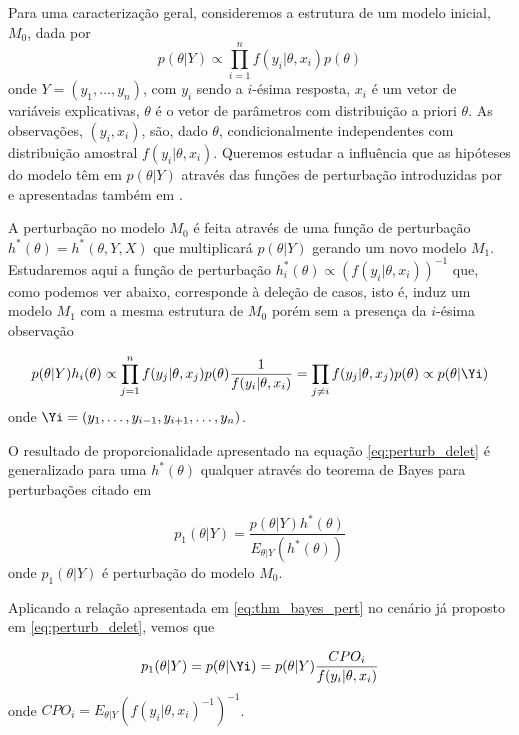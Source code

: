 Para uma caracterização geral, consideremos a estrutura de um modelo inicial, $M_0$, dada por
\begin{equation*}
p(\theta|Y)\propto \prod_{i=1}^n f(y_i|\theta,x_i) p(\theta)
\end{equation*}
onde $Y=(y_1,\ldots,y_n)$, com $y_i$ sendo a $i$-ésima resposta, $x_i$ é um vetor de variáveis explicativas, $\theta$ é o vetor de parâmetros com distribuição a priori $\theta$. As observações, $(y_i,x_i)$, são, dado $\theta$, condicionalmente independentes com distribuição amostral $f(y_i|\theta,x_i)$. Queremos estudar a influência que as hipóteses do modelo têm em $p(\theta|Y)$ através das funções de perturbação introduzidas por \citet{Kass1989} e apresentadas também em \citet{Weiss1996}.

A perturbação no modelo $M_0$ é feita através de uma função de perturbação $h^*(\theta)=h^*(\theta,Y,X)$ que multiplicará $p(\theta|Y)$ gerando um novo modelo $M_1$. Estudaremos aqui a função de perturbação $h^*_i(\theta)\propto\left(f(y_i|\theta,x_i)\right)^{-1}$ que, como podemos ver abaixo, corresponde à deleção de casos, isto é, induz um modelo $M_1$ com a mesma estrutura de $M_0$ porém sem a presença da $i$-ésima observação

\begin{equation}\label{eq:perturb_delet}
p(\theta|Y)h_i(\theta)\propto \prod_{j=1}^nf(y_j|\theta,x_j) p(\theta)\frac{1}{f(y_i|\theta,x_i)}=\prod_{j\neq i}f(y_j|\theta,x_j)p(\theta)\propto p(\theta|\Yi)
\end{equation}
onde $\Yi=(y_1,\ldots,y_{i-1},y_{i+1},\ldots,y_n)$.

O resultado de proporcionalidade apresentado na equação \ref{eq:perturb_delet} é generalizado para uma $h^*(\theta)$ qualquer através do teorema de Bayes para perturbações citado em \citet{Weiss1996}

\begin{equation}\label{eq:thm_bayes_pert}
p_1(\theta|Y)=\frac{p(\theta|Y)h^*(\theta)}{E_{\theta|Y}(h^*(\theta))}
\end{equation}
onde $p_1(\theta|Y)$ é perturbação do modelo $M_0$.

Aplicando a relação apresentada em \ref{eq:thm_bayes_pert} no cenário já proposto em \ref{eq:perturb_delet}, vemos que 

\begin{equation}
p_1(\theta|Y) = p(\theta|\Yi)=p(\theta|Y)\frac{CPO_i}{f(y_i|\theta,x_i)}
\end{equation}
onde $CPO_i = E_{\theta|Y}(f(y_i|\theta,x_i)^{-1})^{-1}$.

